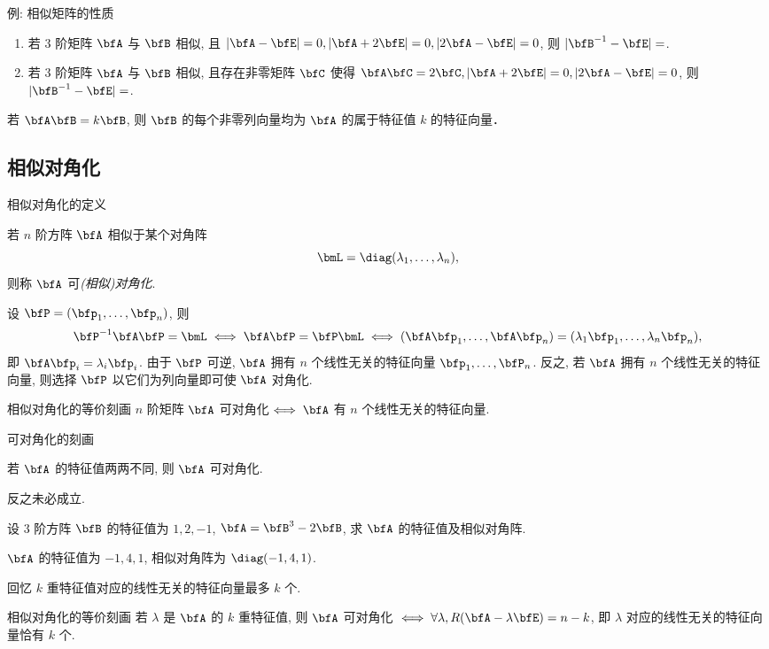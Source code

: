\begin{frame}{例: 相似矩阵的性质}
	\onslide<+->
	\begin{exercise}
		\begin{enumerate}
			\item 若 $3$ 阶矩阵 $\bfA$ 与 $\bfB$ 相似, 且 $|\bfA-\bfE|=0, |\bfA+2\bfE|=0, |2\bfA-\bfE|=0$, 则 $|\bfB^{-1}-\bfE|=$.
			\item 若 $3$ 阶矩阵 $\bfA$ 与 $\bfB$ 相似, 且存在非零矩阵 $\bfC$ 使得 $\bfA\bfC=2\bfC, |\bfA+2\bfE|=0, |2\bfA-\bfE|=0$, 则 $|\bfB^{-1}-\bfE|=$.
		\end{enumerate}
	\end{exercise}
	\onslide<+->
	若 $\bfA\bfB=k\bfB$, 则 $\bfB$ 的每个非零列向量均为 $\bfA$ 的属于特征值 $k$ 的特征向量．
\end{frame}


\subsection{相似对角化}
\begin{frame}{相似对角化的定义}
	\onslide<+->
	\begin{definition}
		若 $n$ 阶方阵 $\bfA$ 相似于某个对角阵
		\[\bmL=\diag(\lambda_1,\dots,\lambda_n),\]
		则称 $\bfA$ 可\emph{(相似)对角化}.
	\end{definition}
	\onslide<+->
	设 $\bfP=(\bfp_1,\dots,\bfp_n)$, 则
	\[\bfP^{-1}\bfA\bfP=\bmL\iff
	\bfA\bfP=\bfP\bmL\iff
	(\bfA\bfp_1,\dots,\bfA\bfp_n)
	=(\lambda_1\bfp_1,\dots,\lambda_n\bfp_n),\]
	\onslide<+->
	即 $\bfA\bfp_i=\lambda_i\bfp_i$.
	\onslide<+->
	由于 $\bfP$ 可逆, $\bfA$ 拥有 $n$ 个线性无关的特征向量 $\bfp_1,\dots,\bfP_n$.
	\onslide<+->
	反之, 若 $\bfA$ 拥有 $n$ 个线性无关的特征向量, 则选择 $\bfP$ 以它们为列向量即可使 $\bfA$ 对角化.
	\onslide<+->
	\begin{algorithm}{相似对角化的等价刻画}
		$n$ 阶矩阵 $\bfA$ 可对角化$\iff\bfA$ 有 $n$ 个线性无关的特征向量.
	\end{algorithm}
\end{frame}


\begin{frame}{可对角化的刻画}
	\onslide<+->
	\begin{corollary}
		若 $\bfA$ 的特征值两两不同, 则 $\bfA$ 可对角化.
	\end{corollary}
	\onslide<+->
	\alert{反之未必成立}.
	\onslide<+->
	\begin{example}
		设 $3$ 阶方阵 $\bfB$ 的特征值为 $1,2,-1$, $\bfA=\bfB^3-2\bfB$, 求 $\bfA$ 的特征值及相似对角阵.
	\end{example}
	\onslide<+->
	\begin{solution}
		$\bfA$ 的特征值为 $-1,4,1$, 相似对角阵为 $\diag(-1,4,1)$.
	\end{solution}
	\onslide<+->
	回忆 $k$ 重特征值对应的线性无关的特征向量最多 $k$ 个.
	\onslide<+->
	\begin{algorithm}{相似对角化的等价刻画}
		若 $\lambda$ 是 $\bfA$ 的 $k$ 重特征值, 则 $\bfA$ 可对角化 $\iff\forall\lambda, R(\bfA-\lambda\bfE)=n-k$, 即 $\lambda$ 对应的线性无关的特征向量恰有 $k$ 个.
	\end{algorithm}
\end{frame}


